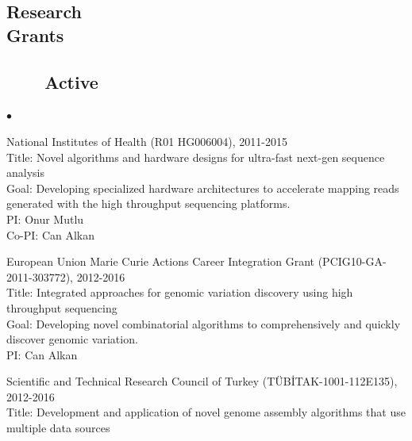 \documentclass[margin,line]{res}
\newenvironment{list2}{
  \begin{list}{$\bullet$}{%
      \setlength{\itemsep}{0in}
      \setlength{\parsep}{0in} \setlength{\parskip}{0in}
      \setlength{\topsep}{0in} \setlength{\partopsep}{0in} 
      \setlength{\leftmargin}{0.2in}}}{\end{list}}
\begin{document}
\begin{resume}
          \section{\sc Research \\ Grants}
                                       \vspace{-0.4cm}
                                       \subsection{\small \sc ~~~~Active}

                                       \begin{list2}
                                       \item
                                         National Institutes of Health (R01 HG006004), 2011-2015\\
                                         Title: Novel algorithms and hardware designs for ultra-fast next-gen sequence analysis\\
                                         Goal: Developing specialized hardware architectures to accelerate mapping reads generated with the high throughput sequencing platforms.\\
                                         PI: Onur Mutlu\\
                                         Co-PI: Can Alkan
                                       \item
                                         European Union Marie Curie Actions Career Integration Grant (PCIG10-GA-2011-303772),  2012-2016\\
                                         Title: Integrated approaches for genomic variation discovery using high throughput sequencing\\
                                         Goal: Developing novel combinatorial algorithms to comprehensively and quickly discover genomic variation.\\
                                         PI: Can Alkan
                                       \item
                                         Scientific and Technical Research Council of Turkey (T\"{U}B\.{I}TAK-1001-112E135), 2012-2016\\
                                         Title: Development and application of novel genome assembly algorithms that use multiple data sources\\

\end{list2}
\end{resume}
\end{document}
